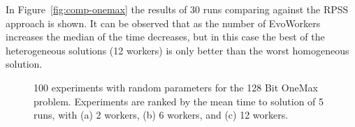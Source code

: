\documentclass{llncs}
\begin{document}
In Figure~\ref{fig:comp-onemax} the results of 30 runs comparing
against the RPSS approach is shown. %
It can be observed that as the number of EvoWorkers increases the median of the time decreases, but
in this case the best of the heterogeneous solutions (12 workers) is only better than the worst homogeneous
solution.  %

\begin{figure}[b]
    \centering

    \caption{100 experiments with random parameters for the 128 Bit OneMax problem.
    Experiments are ranked by the mean time to solution of 5 runs, with   
    (a) 2 workers, (b) 6 workers, and (c) 12 workers.}
    \label{fig:effort}
\end{figure}
\end{document}
